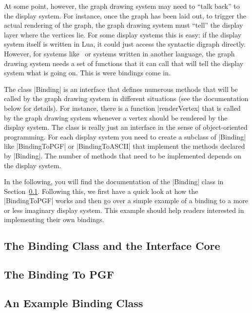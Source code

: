 At some point, however, the graph drawing system may need to ``talk
back'' to the display system. For instance, once the graph has been
laid out, to trigger the actual rendering of the graph, the graph
drawing system must ``tell'' the display layer where the vertices
lie. For some display systems this is easy: if the display system
itself is written in Lua, it could just access the syntactic digraph
directly. However, for systems like \tikzname\ or systems written in
another language, the graph drawing system needs a set of functions
that it can call that will tell the display system what is going
on. This is were bindings come in.

The class |Binding| is an interface that defines numerous methods that
will be called by the graph drawing system in different situations (see
the documentation below for details). For instance, there is a
function |renderVertex| that is called by the graph drawing system
whenever a vertex should be rendered by the display system. The class
is really just an interface in the sense of object-oriented
programming. For each display system you need to create a subclass of
|Binding| like |BindingToPGF| or |BindingToASCII| that implement the
methods declared by |Binding|. The number of methods that need to be
implemented depends on the display system.

In the following, you will find the documentation of the |Binding|
class in Section~\ref{section-gd-binding-doc}. Following this, we
first have a quick look at how the |BindingToPGF| works and then go
over a simple example of a binding to a more or less imaginary
display system. This example should help readers interested in
implementing their own bindings.


\subsection{The Binding Class and the Interface Core}
\label{section-gd-binding-doc}



\subsection{The Binding To PGF}



\subsection{An Example Binding Class}

